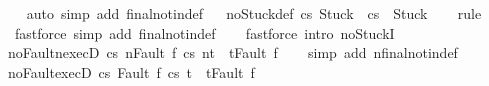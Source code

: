 \begin{isabellebody}
%
\isadelimproof
\ \ %
\endisadelimproof
%
\isatagproof
{}\isamarkupfalse%
\ {\isacharparenleft}auto\ simp\ add{\isacharcolon}\ final{\isacharunderscore}notin{\isacharunderscore}def{\isacharparenright}%
\endisatagproof
{\isafoldproof}%
%
\isadelimproof
\isanewline
%
\endisadelimproof
\ \isanewline
{}\isamarkupfalse%
\ noStuck{\isacharunderscore}def{\isacharprime}{\isacharcolon}\ {\isachardoublequoteopen}{\isasymGamma}{\isasymturnstile}{\isasymlangle}c{\isacharcomma}s{\isasymrangle}\ {\isasymRightarrow}{\isasymnotin}{\isacharbraceleft}Stuck{\isacharbraceright}\ {\isacharequal}\ {\isacharparenleft}{\isasymnot}{\isasymGamma}{\isasymturnstile}{\isasymlangle}c{\isacharcomma}s{\isasymrangle}\ {\isasymRightarrow}\ Stuck{\isacharparenright}{\isachardoublequoteclose}\isanewline
%
\isadelimproof
\ \ %
\endisadelimproof
%
\isatagproof
{}\isamarkupfalse%
\ rule\isanewline
\ \ \isamarkupfalse%
\ \ {\isacharparenleft}fastforce\ simp\ add{\isacharcolon}\ final{\isacharunderscore}notin{\isacharunderscore}def{\isacharparenright}\isanewline
\ \ \isamarkupfalse%
\ {\isacharparenleft}fastforce\ intro{\isacharcolon}\ noStuckI{\isacharprime}{\isacharparenright}\isanewline
\ \ \isamarkupfalse%
%
\endisatagproof
{\isafoldproof}%
%
\isadelimproof
\isanewline
%
\endisadelimproof
\isanewline
\isanewline
{}\isamarkupfalse%
\ noFaultn{\isacharunderscore}execD{\isacharcolon}\ {\isachardoublequoteopen}{\isasymlbrakk}{\isasymGamma}{\isasymturnstile}{\isasymlangle}c{\isacharcomma}s{\isasymrangle}\ {\isacharequal}n{\isasymRightarrow}{\isasymnotin}{\isacharbraceleft}Fault\ f{\isacharbraceright}{\isacharsemicolon}\ {\isasymGamma}{\isasymturnstile}{\isasymlangle}c{\isacharcomma}s{\isasymrangle}\ {\isacharequal}n{\isasymRightarrow}t{\isasymrbrakk}\ {\isasymLongrightarrow}\ t{\isasymnoteq}Fault\ f{\isachardoublequoteclose}\isanewline
%
\isadelimproof
\ \ %
\endisadelimproof
%
\isatagproof
{}\isamarkupfalse%
\ {\isacharparenleft}simp\ add{\isacharcolon}\ nfinal{\isacharunderscore}notin{\isacharunderscore}def{\isacharparenright}%
\endisatagproof
{\isafoldproof}%
%
\isadelimproof
\isanewline
%
\endisadelimproof
\isanewline
{}\isamarkupfalse%
\ noFault{\isacharunderscore}execD{\isacharcolon}\ {\isachardoublequoteopen}{\isasymlbrakk}{\isasymGamma}{\isasymturnstile}{\isasymlangle}c{\isacharcomma}s{\isasymrangle}\ {\isasymRightarrow}{\isasymnotin}{\isacharbraceleft}Fault\ f{\isacharbraceright}{\isacharsemicolon}\ {\isasymGamma}{\isasymturnstile}{\isasymlangle}c{\isacharcomma}s{\isasymrangle}\ {\isasymRightarrow}t{\isasymrbrakk}\ {\isasymLongrightarrow}\ t{\isasymnoteq}Fault\ f{\isachardoublequoteclose}\isanewline

\end{isabellebody}
